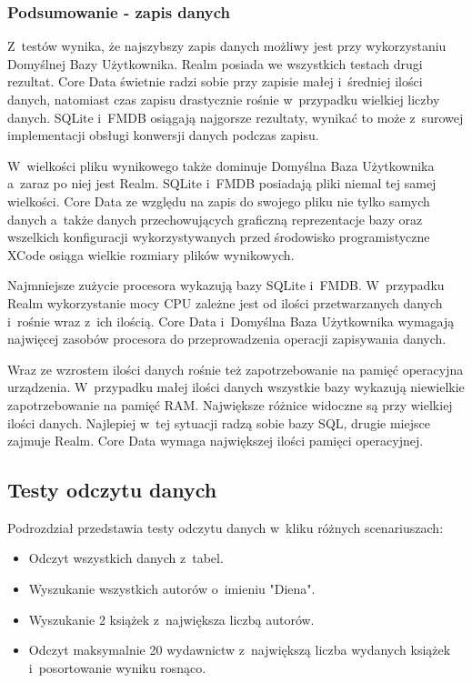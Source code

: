 \subsubsection{Podsumowanie - zapis danych}

 Z~testów wynika, że najszybszy zapis danych możliwy jest przy wykorzystaniu Domyślnej Bazy Użytkownika. Realm posiada we wszystkich testach drugi rezultat. Core Data świetnie radzi sobie przy zapisie małej i~średniej ilości danych, natomiast czas zapisu drastycznie rośnie w~przypadku wielkiej liczby danych. SQLite i~FMDB osiągają najgorsze rezultaty, wynikać to może z~surowej implementacji obsługi konwersji danych podczas zapisu. 

 W~wielkości pliku wynikowego także dominuje Domyślna Baza Użytkownika a~zaraz po niej jest Realm. SQLite i~FMDB posiadają pliki niemal tej samej wielkości. Core Data ze względu na zapis do swojego pliku nie tylko samych danych a~także danych przechowujących graficzną reprezentacje bazy oraz wszelkich konfiguracji wykorzystywanych przed środowisko programistyczne XCode osiąga wielkie rozmiary plików wynikowych. 

Najmniejsze zużycie procesora wykazują bazy SQLite i~FMDB. W~przypadku Realm wykorzystanie mocy CPU zależne jest od ilości przetwarzanych danych i~rośnie wraz z~ich ilością. Core Data i~Domyślna Baza Użytkownika wymagają najwięcej zasobów procesora do przeprowadzenia operacji zapisywania danych. 

Wraz ze wzrostem ilości danych rośnie też zapotrzebowanie na pamięć operacyjna urządzenia. W~przypadku małej ilości danych wszystkie bazy wykazują niewielkie zapotrzebowanie na pamięć RAM. Największe różnice widoczne są przy wielkiej ilości danych. Najlepiej w~tej sytuacji radzą sobie bazy SQL, drugie miejsce zajmuje Realm. Core Data wymaga największej  ilości pamięci operacyjnej. 

\subsection{Testy odczytu danych}

Podrozdział przedstawia testy odczytu danych w~kliku różnych scenariuszach: 

\begin{itemize}
\item Odczyt wszystkich danych z~tabel.
\item Wyszukanie wszystkich autorów o~imieniu "Diena".
\item Wyszukanie 2 książek z~największa liczbą autorów.
\item Odczyt maksymalnie 20 wydawnictw z~największą liczba wydanych książek i~posortowanie wyniku rosnąco.
\end{itemize}

